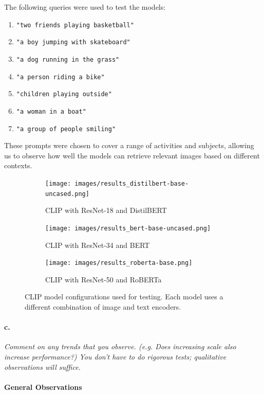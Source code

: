 \documentclass{article}
\begin{document}
The following queries were used to test the models:
\begin{enumerate}
    \item \texttt{"two friends playing basketball"}
    \item \texttt{"a boy jumping with skateboard"}
    \item \texttt{"a dog running in the grass"}
    \item \texttt{"a person riding a bike"}
    \item \texttt{"children playing outside"}
    \item \texttt{"a woman in a boat"}
    \item \texttt{"a group of people smiling"}
\end{enumerate}

These prompts were chosen to cover a range of activities and subjects, allowing us to observe how well the models can retrieve relevant images based on different contexts.

\begin{figure}[h!]
    \centering
    \begin{subfigure}{0.5\textwidth}
        \texttt{[image: images/results\_distilbert-base-uncased.png]}
        \caption{CLIP with ResNet-18 and DistilBERT}
    \end{subfigure}
    \begin{subfigure}{0.5\textwidth}
        \texttt{[image: images/results\_bert-base-uncased.png]}
        \caption{CLIP with ResNet-34 and BERT}
    \end{subfigure}
    \begin{subfigure}{0.5\textwidth}
        \texttt{[image: images/results\_roberta-base.png]}
        \caption{CLIP with ResNet-50 and RoBERTa}
    \end{subfigure}
    \caption{CLIP model configurations used for testing. Each model uses a different combination of image and text encoders.}
    \label{fig:clip_models}
\end{figure}

\paragraph{c.} \textit{Comment on any trends that you observe. (e.g. Does increasing scale also increase performance?) You don’t have to do rigorous tests; qualitative observations will suffice.}

\paragraph{General Observations}
\end{document}
